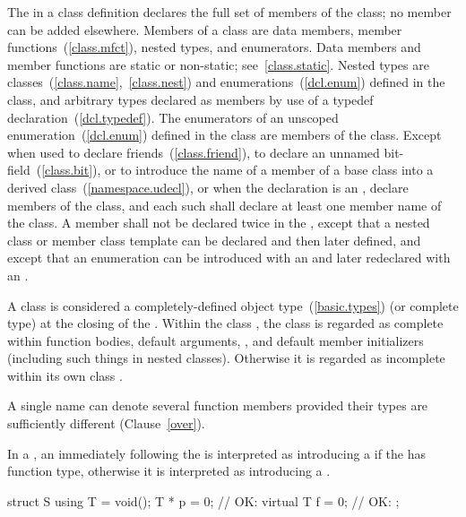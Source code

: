 \pnum
{}%
The  in a class definition declares the
full set of members of the class; no member can be added elsewhere.
Members of a class are data members, member
functions~(\ref{class.mfct}), nested types, and enumerators. Data
members and member functions are static or non-static;
see~\ref{class.static}. Nested types are
classes~(\ref{class.name},~\ref{class.nest}) and
enumerations~(\ref{dcl.enum}) defined in the class, and arbitrary types
declared as members by use of a typedef declaration~(\ref{dcl.typedef}).
The enumerators of an unscoped enumeration~(\ref{dcl.enum}) defined in the class
are members of the class. Except when used to declare
friends~(\ref{class.friend}), to declare an unnamed bit-field~(\ref{class.bit}),
or to introduce the name of a member of a
base class into a derived
class~(\ref{namespace.udecl}), or when the declaration is an
,
 declare members of the class, and each
such  shall declare at least one member
name of the class. A member shall not be declared twice in the
, except that a nested class or member
class template can be declared and then later defined, and except that an
enumeration can be introduced with an  and later
redeclared with an .

\pnum
{}%
A class is considered a completely-defined object
type~(\ref{basic.types}) (or complete type) at the closing \tcode{\}} of
the .
Within the class
, the class is regarded as complete
within function bodies, default arguments,
, and
default member initializers
(including such things in nested classes).
Otherwise it is regarded as incomplete within its own class
.

\pnum
\enternote
A single name can denote several function members provided their types
are sufficiently different (Clause~\ref{over}).
\exitnote

\pnum
In a ,
an \tcode{=} immediately following the 
is interpreted as introducing a 
if the  has function type,
otherwise it is interpreted as introducing
a .
\enterexample
\begin{codeblock}
struct S {
  using T = void();
  T * p = 0;        // OK: 
  virtual T f = 0;  // OK: 
};
\end{codeblock}
\exitexample

